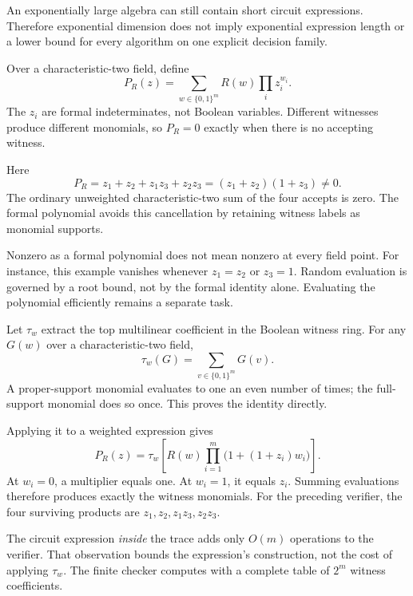 An exponentially large algebra can still contain short circuit expressions.
Therefore exponential dimension does not imply exponential expression length
or a lower bound for every algorithm on one explicit decision family.


Over a characteristic-two field, define
\[
 P_R(z)=\sum_{w\in\{0,1\}^m}R(w)\prod_i z_i^{w_i}.
\]
The $z_i$ are formal indeterminates, not Boolean variables. Different
witnesses produce different monomials, so $P_R=0$ exactly when there is
no accepting witness.


Here
\[
 P_R=z_1+z_2+z_1z_3+z_2z_3=(z_1+z_2)(1+z_3)\ne0.
\]
The ordinary unweighted characteristic-two sum of the four accepts is
zero. The formal polynomial avoids this cancellation by retaining witness
labels as monomial supports.

Nonzero as a formal polynomial does not mean nonzero at every field point.
For instance, this example vanishes whenever $z_1=z_2$ or $z_3=1$.
Random evaluation is governed by a root bound, not by the formal identity
alone. Evaluating the polynomial efficiently remains a separate task.


Let $\tau_w$ extract the top multilinear coefficient in the Boolean witness
ring. For any $G(w)$ over a characteristic-two field,
\[
 \tau_w(G)=\sum_{v\in\{0,1\}^m}G(v).
\]
A proper-support monomial evaluates to one an even number of times; the
full-support monomial does so once. This proves the identity directly.

Applying it to a weighted expression gives
\[
 P_R(z)=\tau_w\!\left[
 R(w)\prod_{i=1}^m\bigl(1+(1+z_i)w_i\bigr)\right].
\]
At $w_i=0$, a multiplier equals one. At $w_i=1$, it equals $z_i$.
Summing evaluations therefore produces exactly the witness monomials.
For the preceding verifier, the four surviving products are
$z_1,z_2,z_1z_3,z_2z_3$.

The circuit expression \emph{inside} the trace adds only $O(m)$ operations
to the verifier. That observation bounds the expression's construction,
not the cost of applying $\tau_w$. The finite checker computes with a
complete table of $2^m$ witness coefficients.

